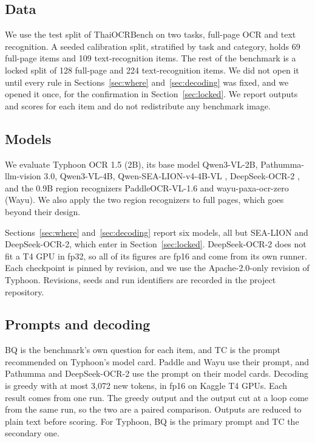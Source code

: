 \subsection{Data}
We use the test split of ThaiOCRBench \cite{nonesung2025thaiocrbench} on two tasks, full-page OCR and text recognition. A seeded calibration split, stratified by task and category, holds 69 full-page items and 109 text-recognition items. The rest of the benchmark is a locked split of 128 full-page and 224 text-recognition items. We did not open it until every rule in Sections~\ref{sec:where} and~\ref{sec:decoding} was fixed, and we opened it once, for the confirmation in Section~\ref{sec:locked}. We report outputs and scores for each item and do not redistribute any benchmark image.

\subsection{Models}
We evaluate Typhoon OCR 1.5 (2B), its base model Qwen3-VL-2B, Pathumma-llm-vision 3.0, Qwen3-VL-4B, Qwen-SEA-LION-v4-4B-VL \cite{aisingapore2026sealion}, DeepSeek-OCR-2 \cite{wei2026deepseekocr2}, and the 0.9B region recognizers PaddleOCR-VL-1.6 and wayu-paxa-ocr-zero (Wayu). We also apply the two region recognizers to full pages, which goes beyond their design.

Sections~\ref{sec:where} and~\ref{sec:decoding} report six models, all but SEA-LION and DeepSeek-OCR-2, which enter in Section~\ref{sec:locked}. DeepSeek-OCR-2 does not fit a T4 GPU in fp32, so all of its figures are fp16 and come from its own runner. Each checkpoint is pinned by revision, and we use the Apache-2.0-only revision of Typhoon. Revisions, seeds and run identifiers are recorded in the project repository.

\subsection{Prompts and decoding}
BQ is the benchmark's own question for each item, and TC is the prompt recommended on Typhoon's model card. Paddle and Wayu use their  prompt, and Pathumma and DeepSeek-OCR-2 use the prompt on their model cards. Decoding is greedy with at most 3,072 new tokens, in fp16 on Kaggle T4 GPUs. Each result comes from one run. The greedy output and the output cut at a loop come from the same run, so the two are a paired comparison. Outputs are reduced to plain text before scoring. For Typhoon, BQ is the primary prompt and TC the secondary one.

